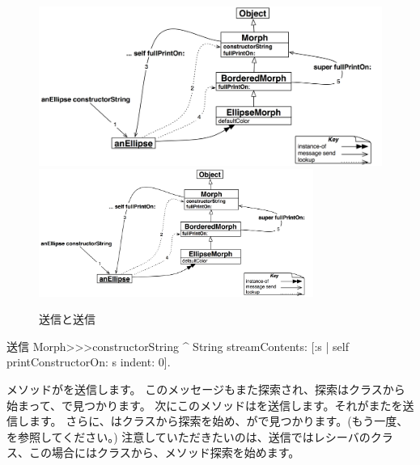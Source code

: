\documentclass[a4paper,10pt,twoside]{book}
\begin{document}
\begin{figure}[htb]
\begin{center}
\ifluluelse
	{\includegraphics[width=\textwidth]{constructorStringLookup}}
	{\includegraphics[width=0.8\textwidth]{constructorStringLookup}}
\caption{\self 送信と\super 送信}
\end{center}
\end{figure}

\begin{method}[constructorString]{\self 送信}
Morph>>>constructorString
	^ String streamContents: [:s | self printConstructorOn: s indent: 0].
\end{method}
メソッドがを\self 送信します。
このメッセージもまた探索され、探索はクラスから始まって、で見つかります。
次にこのメソッドはを\self 送信します。それがまたを\self 送信します。
さらに、はクラスから探索を始め、がで見つかります。(もう一度、を参照してください。)
注意していただきたいのは、\self 送信ではレシーバのクラス、この場合にはクラスから、メソッド探索を始めます。

\end{document}
